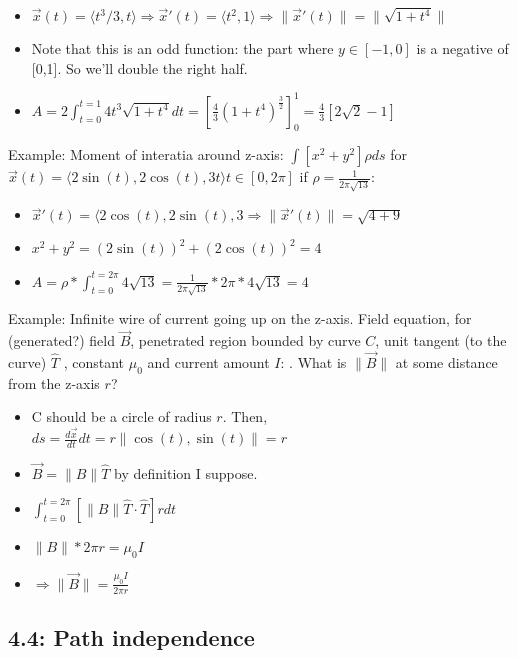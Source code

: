 \documentclass[11pt, oneside]{article}   	%
\begin{document}
\begin{itemize}
\item $\vec{x}(t) = \langle t^3 / 3, t \rangle \Rightarrow \vec{x}'(t)  = \langle t^2, 1 \rangle \Rightarrow \| \vec{x}'(t)  \| = \| \sqrt{1 + t^4} \|$
\item Note that this is an odd function: the part where $y \in [-1, 0]$ is a negative of [0,1].  So we'll double the right half.
\item $A = 2 \int_{t=0}^{t=1} 4t^3 \sqrt{1+t^4}dt =[\frac{4}{3}(1+t^4)^\frac{3}{2}]_0^1 = \frac{4}{3}[2\sqrt{2}- 1]$
\end{itemize}

Example: Moment of interatia around z-axis: $\int[x^2+y^2]\rho ds$ for $\vec{x}(t)=\langle 2\sin(t), 2\cos(t), 3t\rangle t \in [0,2\pi]$ if $\rho = \frac{1}{2\pi\sqrt{13}}$:
\begin{itemize}
\item $\vec{x}'(t) = \langle 2\cos(t), 2\sin(t), 3 \Rightarrow \| \vec{x}'(t)  \| = \sqrt{4 + 9}$
\item $x^2 + y^2 = (2\sin(t))^2 + (2\cos(t))^2 = 4$
\item $A = \rho * \int_{t=0}^{t=2\pi} 4 \sqrt{13} =  \frac{1}{2\pi\sqrt{13}} * 2\pi * 4\sqrt{13} = 4$
\end{itemize}

Example: Infinite wire of current going up on the z-axis.  Field equation, for (generated?) field $\vec{B}$, penetrated region bounded by curve $C$, unit tangent (to the curve) $\hat{T}$ , constant $\mu_0$ and current amount $I$: .  What is $\| \vec{B} \|$ at some distance from the z-axis $r$?
\begin{itemize} 
\item C should be a circle of radius $r$.  Then, $ds = \frac{d\vec{x}}{dt}dt = r \| \cos(t), \sin(t) \| = r$
\item $\vec{B} = \|B\| \hat{T}$ by definition I suppose.
\item $\int_{t = 0}^{t=2\pi} [ \|B\| \hat{T} \cdot \hat{T}] r dt$
\item $\|B\| * 2\pi r = \mu_0 I$
\item $\Rightarrow \|\vec{B}\| = \frac{\mu_0 I}{ 2\pi r }$

\end{itemize} 

\subsection{4.4: Path independence}
\end{document}
